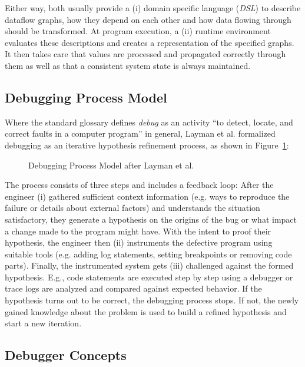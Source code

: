 \documentclass[12pt,a4paper]{article}
\begin{document}
Either way, both usually provide a (i) domain specific language (\emph{DSL}) to describe dataflow graphs, how they depend on each other and how data flowing through should be transformed. At program execution, a (ii) runtime environment evaluates these descriptions and creates a representation of the specified graphs. It then takes care that values are processed and propagated correctly through them as well as that a consistent system state\cite{10.1145/2501654.2501666} is always maintained.

\subsection{Debugging Process Model}

Where the standard glossary defines \emph{debug} as an activity ``to detect, locate, and correct faults in a computer program''\cite{ieeeglossary} in general, Layman et al. \cite{Layman_Diep_Nagappan_Singer_Deline_Venolia_2013} formalized debugging as an iterative hypothesis refinement process, as shown in Figure~\ref{fig:debugging-process-model}:

\begin{figure}[H]
	\centering
	\caption{Debugging Process Model after Layman et al. \cite{Layman_Diep_Nagappan_Singer_Deline_Venolia_2013}}
	\label{fig:debugging-process-model}
\end{figure}

The process consists of three steps and includes a feedback loop: After the engineer (i) gathered sufficient context information (e.g. ways to reproduce the failure or details about external factors) and understands the situation satisfactory, they generate a hypothesis on the origins of the bug or what impact a change made to the program might have. With the intent to proof their hypothesis, the engineer then (ii) instruments the defective program using suitable tools (e.g. adding log statements, setting breakpoints or removing code parts). Finally, the instrumented system gets (iii) challenged against the formed hypothesis. E.g., code statements are executed step by step using a debugger or trace logs are analyzed and compared against expected behavior. If the hypothesis turns out to be correct, the debugging process stops. If not, the newly gained knowledge about the problem is used to build a refined hypothesis and start a new iteration.

\subsection{Debugger Concepts}
\end{document}
